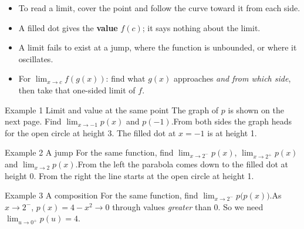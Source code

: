 \documentclass[11pt]{article}
\begin{document}

\begin{ideabox}
\begin{itemize}[leftmargin=*,itemsep=2pt,topsep=2pt]
  \item To read a limit, cover the point and follow the curve toward it from each side.
  \item A filled dot gives the \textbf{value} $f(c)$; it says nothing about the limit.
  \item A limit fails to exist at a jump, where the function is unbounded, or where it oscillates.
  \item For $\displaystyle\lim_{x\to c}f(g(x))$: find what $g(x)$ approaches \emph{and from which side}, then take that one-sided limit of $f$.
\end{itemize}
\end{ideabox}

\begin{example}{Example 1 \textperiodcentered{} Limit and value at the same point}
The graph of $p$ is shown on the next page. Find $\displaystyle\lim_{x\to -1}p(x)$ and $p(-1)$.\soln From both sides the graph heads for the open circle at height 3. The filled dot at $x=-1$ is at height 1.
\end{example}

\begin{example}{Example 2 \textperiodcentered{} A jump}
For the same function, find $\displaystyle\lim_{x\to 2^-}p(x)$, $\displaystyle\lim_{x\to 2^+}p(x)$ and $\displaystyle\lim_{x\to 2}p(x)$.\soln From the left the parabola comes down to the filled dot at height 0. From the right the line starts at the open circle at height 1.
\end{example}

\begin{example}{Example 3 \textperiodcentered{} A composition}
For the same function, find $\displaystyle\lim_{x\to 2^-}p\big(p(x)\big)$.\soln As $x\to2^-$, $p(x)=4-x^2\to0$ through values \emph{greater} than 0. So we need $\displaystyle\lim_{u\to 0^+}p(u)=4$.
\end{example}
\end{document}
